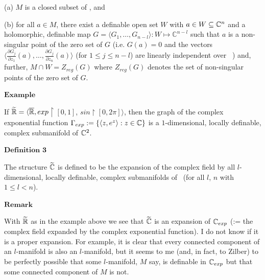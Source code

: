 \documentclass[12pt,nodate]{article}
\begin{document}
\vspace{1mm}

\noindent
(a) $M$ is a closed subset of \Cn  , and 

\vspace{1mm}

\noindent
(b) for all $a \in M$, there exist a definable open set $W$ with $a \in W \subseteq \mathbb{C}^{n}$ and a holomorphic, definable map $G = \langle G_1 , \ldots , G_{n-l} \rangle : W \mapsto \mathbb{C}^{n-l}$ such that $a$ is a non-singular point of the zero set of $G$ (i.e. $G(a) = 0$ and the vectors $\langle \frac{\partial G_j}{\partial z_1} (a) , \ldots , \frac{\partial G_j}{\partial z_n} (a) \rangle$ (for $1 \leq j \leq n-l$) are linearly independent over \C\ ) and, further, $M \cap W = Z_{reg} (G)$ where $Z_{reg} (G)$ denotes the set of non-singular points of the zero set of $G$.


\vspace{3mm}

\noindent
$\mathbf{Example}$

\vspace{1mm}

If $\widetilde{\mathbb{R}} = \langle \overline{\mathbb{R}} , exp$$\upharpoonright[0, 1]$, $sin$$\upharpoonright$$[0, 2\pi ] \rangle$, then the graph of the complex exponential function $\Gamma_{exp} := \{ \langle z, e^z \rangle : z \in \mathbb{C} \}$ is a $1$-dimensional, locally definable, complex submanifold of $\mathbb{C}^2$.

\vspace{3mm}

\noindent
$\mathbf{Definition}$ $\mathbf{3}$

\vspace{1mm}

The structure $\widetilde{\mathbb{C}}$ is defined to be the expansion of the complex field by all $l$-dimensional, locally definable, complex submanifolds of \Cn\  (for all $l$, $n$ with $1 \leq l < n$).

\vspace{2mm}

\noindent
$\mathbf{Remark}$

\vspace{1mm}

With $\widetilde{\mathbb{R}}$ as in the example above we see that $\widetilde{\mathbb{C}}$ is an expansion of $\mathbb{C}_{exp}$ (:= the complex field expanded by the complex exponential function). I do not know if it is a proper expansion. For example, it is clear that every connected component of an $l$-manifold is also an $l$-manifold, but it seems to me (and, in fact, to Zilber) to be perfectly possible that some $l$-manifold, $M$ say, is definable in $\mathbb{C}_{exp}$ but that some connected component of $M$ is not. 
\end{document}
